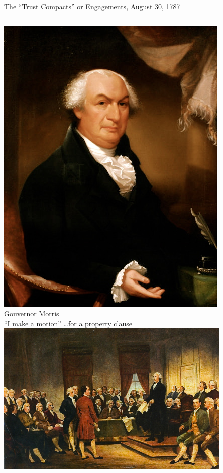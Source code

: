 \begin{frame}{The ``Trust Compacts'' or Engagements, August 30, 1787}
    \begin{columns}[onlytextwidth]
            \centering
            \includegraphics[height=0.4\textheight]{img/morris-portrait.png} \\
            { \tiny  Gouvernor Morris } \\
            { \Large ``I make a motion'' \ldots for a property clause} \\
            \centering
            \includegraphics[width=0.85\textwidth]{img/convention.png} \\
    \end{columns}
\end{frame}

